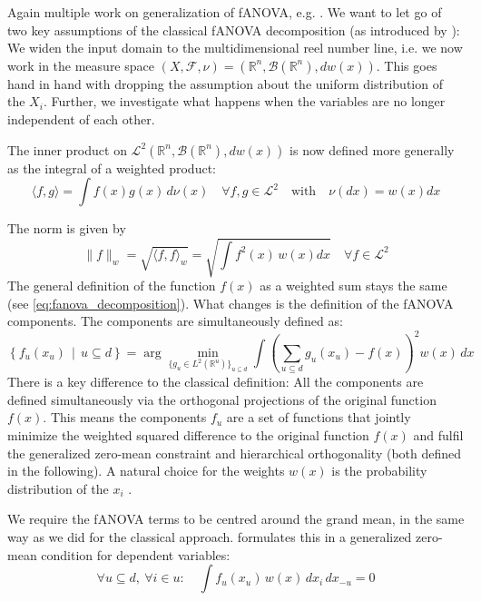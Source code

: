 Again multiple work on generalization of fANOVA, e.g. \cite{hooker2007,rahman2014, chastaing2012}.
We want to let go of two key assumptions of the classical fANOVA decomposition (as introduced by \cite{sobol1993sensitivity}): We widen the input domain to the multidimensional reel number line, i.e. we now work in the measure space $(X, \mathcal{F}, \nu) = (\mathbb{R}^n, \mathcal{B}(\mathbb{R}^n), dw(x))$. This goes hand in hand with dropping the assumption about the uniform distribution of the $X_i$. Further, we investigate what happens when the variables are no longer independent of each other.\par
The inner product on $\mathcal{L}^2(\mathbb{R}^n, \mathcal{B}(\mathbb{R}^n), dw(x))$ is now defined more generally as the integral of a weighted product:
\[
\langle f, g \rangle = \int f(x) g(x) \, d\nu(x) \quad \forall f, g \in \mathcal{L}^2 \quad \text{with} \quad \nu(dx) = w(x)dx
\]

The norm is given by 
\[
\|f\|_{w} = \sqrt{\langle f, f \rangle_{w}} = \sqrt{\int f^2(x) \, w(x)dx} \quad \forall f \in \mathcal{L}^2
\]
The general definition of the function $f(x)$ as a weighted sum stays the same (see \autoref{eq:fanova_decomposition}). What changes is the definition of the fANOVA components. The components are simultaneously defined as:
\begin{equation}
\left\{ f_u(x_u) \,\middle|\, u \subseteq d \right\}
= \arg\min_{\{g_u \in L^2(\mathbb{R}^u)\}_{u \subseteq d}} 
\int \left( \sum_{u \subseteq d} g_u(x_u) - f(x) \right)^2 w(x) \, dx
\label{eq:fanova_decomposition_generalized}
\end{equation}
There is a key difference to the classical definition: All the components are defined simultaneously via the orthogonal projections of the original function $f(x)$. This means the components $f_u$ are a set of functions that jointly minimize the weighted squared difference to the original function $f(x)$ and fulfil the generalized zero-mean constraint and hierarchical orthogonality (both defined in the following). A natural choice for the weights $w(x)$ is the probability distribution of the $x_i$ \citep{hooker2007}.\par

We require the fANOVA terms to be centred around the grand mean, in the same way as we did for the classical approach.
\cite{hooker2007} formulates this in a generalized zero-mean condition for dependent variables:
\begin{equation}
\forall u \subseteq d,\ \forall i \in u: \quad 
\int f_u(x_u)\, w(x)\, dx_i\, dx_{-u} = 0
\label{eq:zero_mean_condition_generalized}
\end{equation}


